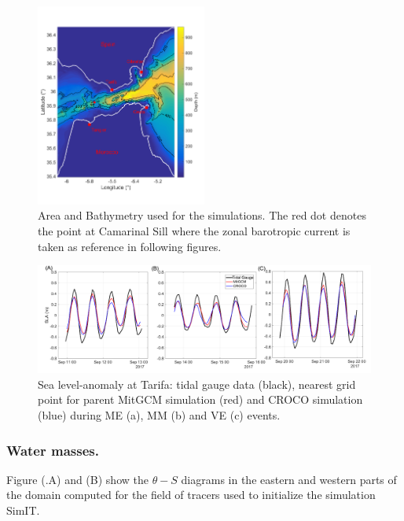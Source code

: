 \begin{figure}[!h]
        \centering
        \includegraphics[width=0.5\textwidth]{./GBR3D/FigBathyVHR.png}
        \caption[Area and Bathymetry used for the simulations.]{Area and Bathymetry used for the simulations. The red dot denotes the point at Camarinal Sill where the zonal barotropic current is taken as reference in following figures.}
        \label{FigBathy3D}
\end{figure}

\begin{figure}[!h]
        \includegraphics[width=\textwidth]{./GBR3D/SLA_Tarifa_ME2VE2IES.png}
        \caption[Sea level-anomaly at Tarifa.]{Sea level-anomaly at Tarifa: tidal gauge data (black), nearest grid point for parent MitGCM simulation (red) and CROCO simulation (blue) during ME (a), MM (b) and VE (c) events.}
        \label{fig_maree_tar}
\end{figure}

\subsubsection{Water masses.}
\label{sectionWaterMasses}
Figure (.A) and (B) show the $\theta-S$ diagrams in the eastern and western parts of the domain computed for the field of tracers used to initialize the simulation SimIT. 

